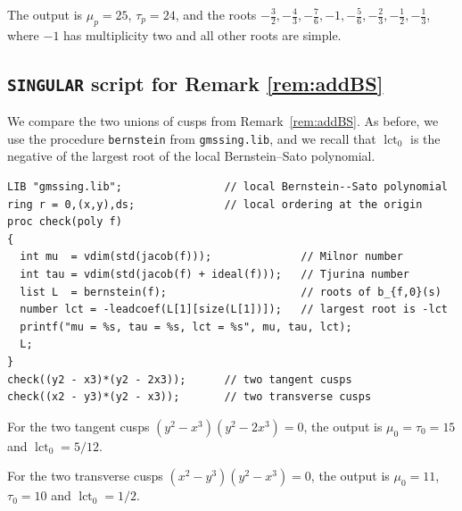 \documentclass[11pt]{amsart}
\theoremstyle{definition}
\numberwithin{equation}{section}
\DeclareMathOperator{\lct}{lct}
\begin{document}
The output is $\mu_p=25$, $\tau_p=24$, and the roots
$-\tfrac32,-\tfrac43,-\tfrac76,-1,-\tfrac56,-\tfrac23,-\tfrac12,-\tfrac13$,
where $-1$ has multiplicity two and all other roots are simple.

\subsection*{\texttt{SINGULAR} script for Remark \ref{rem:addBS}}
We compare the two unions of cusps from Remark~\ref{rem:addBS}.
As before, we use the procedure \texttt{bernstein} from \texttt{gmssing.lib}, and we recall
that $\lct_0$ is the negative of the largest root of the local Bernstein--Sato polynomial.

\begin{verbatim}
LIB "gmssing.lib";                // local Bernstein--Sato polynomial
ring r = 0,(x,y),ds;              // local ordering at the origin
proc check(poly f)
{
  int mu  = vdim(std(jacob(f)));              // Milnor number
  int tau = vdim(std(jacob(f) + ideal(f)));   // Tjurina number
  list L  = bernstein(f);                     // roots of b_{f,0}(s)
  number lct = -leadcoef(L[1][size(L[1])]);   // largest root is -lct
  printf("mu = %s, tau = %s, lct = %s", mu, tau, lct);
  L;
}
check((y2 - x3)*(y2 - 2x3));      // two tangent cusps
check((x2 - y3)*(y2 - x3));       // two transverse cusps
\end{verbatim}

For the two tangent cusps $(y^2-x^3)(y^2-2x^3)=0$, the output is $\mu_0=\tau_0=15$ and
$\lct_0=5/12$. 

For the two transverse cusps $(x^2-y^3)(y^2-x^3)=0$, the output is $\mu_0=11$, $\tau_0=10$
and $\lct_0=1/2$.
\end{document}
